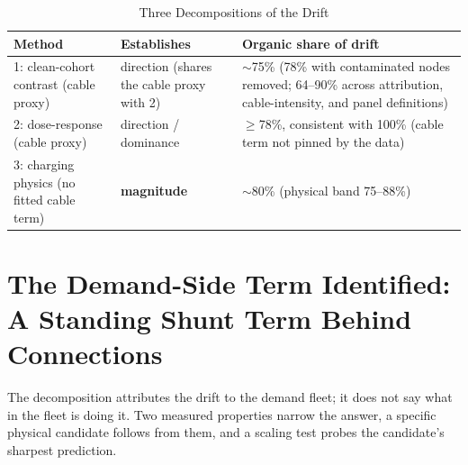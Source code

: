 \documentclass[journal]{IEEEtran}
\begin{document}
\begin{table}[!t]
\caption{Three Decompositions of the Drift}
\label{tab:triangulation}
\centering
\renewcommand{\arraystretch}{1.18}
\begin{tabular}{@{}p{}p{}p{}@{}}
\toprule
\textbf{Method} & \textbf{Establishes} & \textbf{Organic share of drift} \\
\midrule
1: clean-cohort contrast (cable proxy) & direction (shares the cable proxy with 2) & $\sim$75\% (78\% with contaminated nodes removed; 64--90\% across attribution, cable-intensity, and panel definitions) \\
2: dose-response (cable proxy) & direction / dominance & $\geq$78\%, consistent with 100\% (cable term not pinned by the data) \\
3: charging physics (no fitted cable term) & \textbf{magnitude} & $\sim$80\% (physical band 75--88\%) \\
\bottomrule
\end{tabular}
\end{table}

\section{The Demand-Side Term Identified: A Standing Shunt Term Behind
Connections}
The decomposition attributes the drift to the demand fleet; it does not say what
in the fleet is doing it. Two measured properties narrow the answer, a specific
physical candidate follows from them, and a scaling test probes the candidate's
sharpest prediction.
\end{document}
